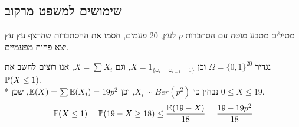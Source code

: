 \subsection{שימושים למשפט מרקוב}
\begin{exercise}
	מטילים מטבע מוטה עם הסתברות $p$ לעץ, 20 פעמים,
	חסמו את ההסתברות שהרצף עץ עץ יצא פחות מפעמיים.
\end{exercise}
\begin{solution}
	נגדיר $\Omega = {\{0, 1\}}^{20}$ וכן $X = 1_{\{\omega_i = \omega_{i + 1} = 1\}}$, וגם $X = \sum X_i$, אנו רוצים לחשב את $\mathbb{P}(X \le 1)$. \\*
	נבחין כי $X_i \sim Ber(p^2)$, וכן $\mathbb{E}(X) = \sum \mathbb{E}(X_i)  = 19 p^2$, שכן $0 \le X \le 19$.
	\[
		\mathbb{P}(X \le 1)
		= \mathbb{P}(19 - X \ge 18)
		\le \frac{\mathbb{E}(19 - X)}{18}
		= \frac{19 - 19p^2}{18}
	\]
\end{solution}

